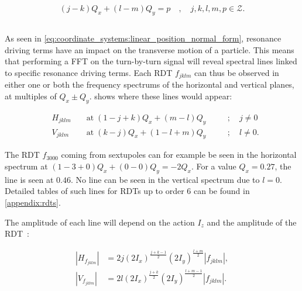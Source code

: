 \begin{equation}
    (j-k)Q_x + (l-m)Q_y = p \quad,\quad j,k,l,m,p \in \mathcal{Z}.
\end{equation}

\FloatBarrier


\subsection{}
\label{section:background:frequency_spectrum}

As seen in \cref{eq:coordinate_systems:linear_position_normal_form}, resonance driving terms have an
impact on the transverse motion of a particle. This means that performing a FFT on the turn-by-turn
signal will reveal spectral lines linked to specific resonance driving terms.
Each RDT $f_{jklm}$ can thus be observed in either one or both the frequency spectrums of the
horizontal and vertical planes, at multiples of $Q_x \pm Q_y$. 
shows where these lines would appear:

\begin{equation}
    \begin{aligned}
    & H_{jklm} \;&&\text{at}\; (1 - j + k)Q_x + (m - l)Q_y \quad&&; \quad j \ne 0 \\
    & V_{jklm}   &&\text{at}\; (k - j)Q_x + (1 - l + m)Q_y      &&; \quad l \ne 0.
    \end{aligned}
    \label{eq:resonances:rdt_spectrum}
\end{equation}

The RDT $f_{3000}$ coming from sextupoles can for example be seen in the horizontal spectrum at
$(1-3+0)Q_x + (0-0)Q_y = -2Q_x$. For a value $Q_x = 0.27$, the line is seen at $0.46$. No line can
be seen in the vertical spectrum due to $l = 0$. Detailed tables of such lines for RDTs up to order
6 can be found in \cref{appendix:rdts}.

The amplitude of each line will depend on the action $I_z$ and the amplitude of the
RDT~\cite{bartolini_normal_1997}:

\begin{equation}
    \begin{aligned}
    |H_{f_{jklm}}| &= 2 j (2 I_x)^\frac{j+k-1}{2} (2 I_y)^\frac{l+m}{2} |f_{jklm}|, \\
    |V_{f_{jklm}}| &= 2 l (2 I_x)^\frac{j+k}{2} (2 I_y)^\frac{l+m-1}{2} |f_{jklm}|.
    \end{aligned}
    \label{eq:resonances:amplitude_line}
\end{equation}


